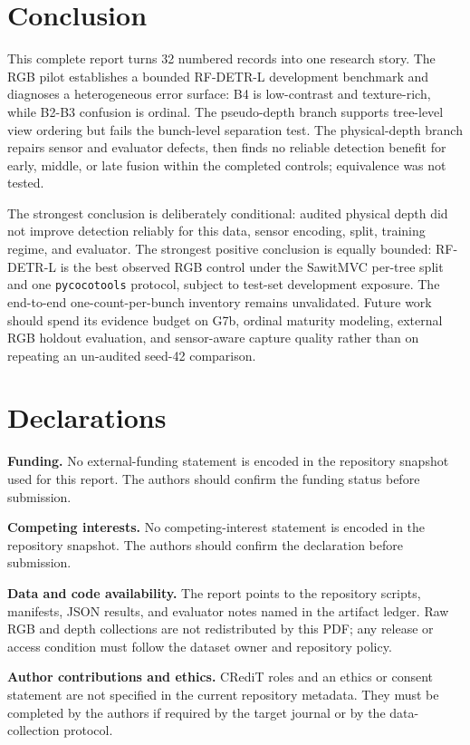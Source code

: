 \documentclass[preprint,12pt]{elsarticle}
\begin{document}
\section{Conclusion}
\label{sec:final-conclusion}
This complete report turns 32 numbered records into one research story. The RGB
pilot establishes a bounded RF-DETR-L development benchmark and diagnoses a heterogeneous
error surface: B4 is low-contrast and texture-rich, while B2-B3 confusion is
ordinal. The pseudo-depth branch supports tree-level view ordering but fails
the bunch-level separation test. The physical-depth branch repairs sensor and
evaluator defects, then finds no reliable detection benefit for early, middle,
or late fusion within the completed controls; equivalence was not tested.

The strongest conclusion is deliberately conditional: audited physical depth
did not improve detection reliably for this data, sensor encoding, split,
training regime, and evaluator. The strongest positive conclusion is equally
bounded: RF-DETR-L is the best observed RGB control under the SawitMVC
per-tree split and one \texttt{pycocotools} protocol, subject to test-set
development exposure. The end-to-end one-count-per-bunch inventory remains
unvalidated. Future work should spend its evidence budget on G7b, ordinal
maturity modeling, external RGB holdout evaluation, and sensor-aware capture
quality rather than on repeating an un-audited seed-42 comparison.

\section*{Declarations}
\textbf{Funding.} No external-funding statement is encoded in the repository
snapshot used for this report. The authors should confirm the funding status
before submission.

\textbf{Competing interests.} No competing-interest statement is encoded in
the repository snapshot. The authors should confirm the declaration before
submission.

\textbf{Data and code availability.} The report points to the repository
scripts, manifests, JSON results, and evaluator notes named in the artifact
ledger. Raw RGB and depth collections are not redistributed by this PDF; any
release or access condition must follow the dataset owner and repository
policy.

\textbf{Author contributions and ethics.} CRediT roles and an ethics or
consent statement are not specified in the current repository metadata. They
must be completed by the authors if required by the target journal or by the
data-collection protocol.
\end{document}

